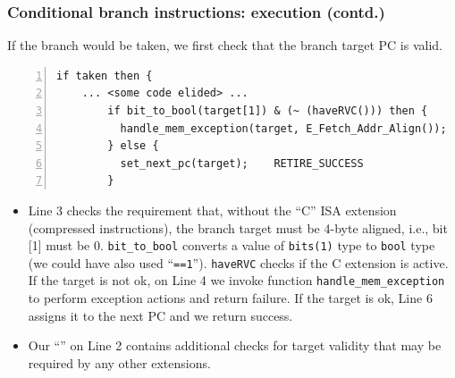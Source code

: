 \documentclass[aspectratio=169]{beamer}
\newcommand{\slidefont}{\scriptsize}
\newcommand{\cf}{\scriptsize\tt}
\begin{document}

\begin{frame}[fragile]
  \frametitle{Conditional branch instructions: execution (contd.)}

  \slidefont

  If the branch would be taken, we first check that the branch target PC is valid.

  \vspace{1ex}

  \begin{Verbatim}[frame=single, numbers=left, label = File riscv\_types.sail]
  if taken then {
    ... <some code elided> ...
        if bit_to_bool(target[1]) & (~ (haveRVC())) then {
          handle_mem_exception(target, E_Fetch_Addr_Align());    RETIRE_FAIL;
        } else {
          set_next_pc(target);    RETIRE_SUCCESS
        }
  \end{Verbatim}

  \begin{minipage}{\textwidth}
    \begin{itemize}
    \item Line 3 checks the requirement that, without the ``C'' ISA
      extension (compressed instructions), the branch target must be
      4-byte aligned, i.e., bit [1] must be 0. {\cf bit\_to\_bool}
      converts a value of {\cf bits(1)} type to {\cf bool} type (we
      could have also used ``{\cf ==1}''). {\cf haveRVC} checks if the
      C extension is active. If the target is not ok, on Line 4 we
      invoke function {\cf handle\_mem\_exception} to perform
      exception actions and return failure.  If the target is ok, Line
      6 assigns it to the next PC and we return success.

    \item Our ``{\cf <some code elided>}'' on Line 2 contains
      additional checks for target validity that may be required by
      any other extensions.
    \end{itemize}
  \end{minipage}


\end{frame}

\end{document}
